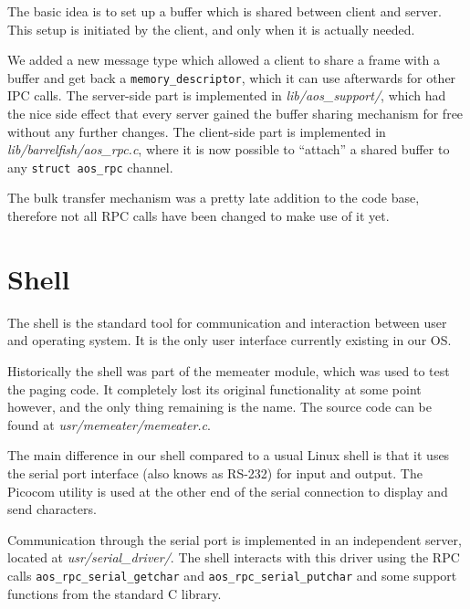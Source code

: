 \documentclass[a4paper,10pt]{article}
\newcommand{\todoref}{\todo{ref}}
\newcommand{\filepath}[1]{\emph{ #1}}
\begin{document}
The basic idea is to set up a buffer which is shared between client and server.
This setup is initiated by the client, and only when it is actually needed.

We added a new message type which allowed a client to share a frame with a buffer and get back a \lstinline!memory_descriptor!, which it can use afterwards for other IPC calls.
The server-side part is implemented in \filepath{lib/aos\_support/}, which had the nice side effect that every server gained the buffer sharing mechanism for free without any further changes.
The client-side part is implemented in \filepath{lib/barrelfish/aos\_rpc.c}, where it is now possible to ``attach'' a shared buffer to any \lstinline!struct aos_rpc! channel.

The bulk transfer mechanism was a pretty late addition to the code base, therefore not all RPC calls have been changed to make use of it yet.

\section{Shell}
The shell is the standard tool for communication and interaction between user and operating system.
It is the only user interface currently existing in our OS.
  
Historically the shell was part of the memeater module, which was used to test the paging code.
It completely lost its original functionality at some point however, and the only thing remaining is the name.
The source code can be found at \filepath{usr/memeater/memeater.c}.

The main difference in our shell compared to a usual Linux shell is that it uses the serial port interface (also knows as RS-232) for input and output.
The Picocom \todoref utility is used at the other end of the serial connection to display and send characters.

Communication through the serial port is implemented in an independent server, located at \filepath{usr/serial\_driver/}.
The shell interacts with this driver using the RPC calls \lstinline!aos_rpc_serial_getchar! and \lstinline!aos_rpc_serial_putchar! and some support functions from the standard C library.
\end{document}
